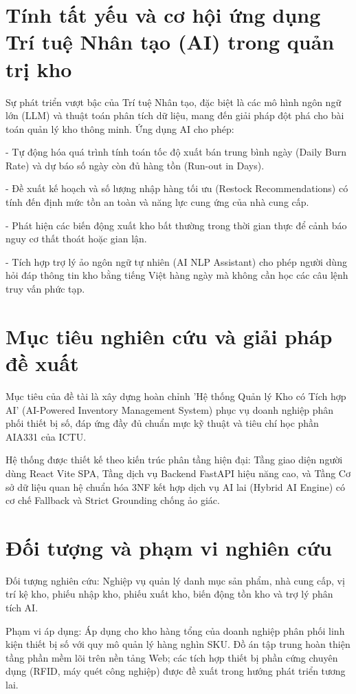 \section{Tính tất yếu và cơ hội ứng dụng Trí tuệ Nhân tạo (AI) trong quản trị kho}

Sự phát triển vượt bậc của Trí tuệ Nhân tạo, đặc biệt là các mô hình ngôn ngữ lớn (LLM) và thuật toán phân tích dữ liệu, mang đến giải pháp đột phá cho bài toán quản lý kho thông minh. Ứng dụng AI cho phép:

- Tự động hóa quá trình tính toán tốc độ xuất bán trung bình ngày (Daily Burn Rate) và dự báo số ngày còn đủ hàng tồn (Run-out in Days).

- Đề xuất kế hoạch và số lượng nhập hàng tối ưu (Restock Recommendations) có tính đến định mức tồn an toàn và năng lực cung ứng của nhà cung cấp.

- Phát hiện các biến động xuất kho bất thường trong thời gian thực để cảnh báo nguy cơ thất thoát hoặc gian lận.

- Tích hợp trợ lý ảo ngôn ngữ tự nhiên (AI NLP Assistant) cho phép người dùng hỏi đáp thông tin kho bằng tiếng Việt hàng ngày mà không cần học các câu lệnh truy vấn phức tạp.

\section{Mục tiêu nghiên cứu và giải pháp đề xuất}

Mục tiêu của đề tài là xây dựng hoàn chỉnh 'Hệ thống Quản lý Kho có Tích hợp AI' (AI-Powered Inventory Management System) phục vụ doanh nghiệp phân phối thiết bị số, đáp ứng đầy đủ chuẩn mực kỹ thuật và tiêu chí học phần AIA331 của ICTU.

Hệ thống được thiết kế theo kiến trúc phân tầng hiện đại: Tầng giao diện người dùng React Vite SPA, Tầng dịch vụ Backend FastAPI hiệu năng cao, và Tầng Cơ sở dữ liệu quan hệ chuẩn hóa 3NF kết hợp dịch vụ AI lai (Hybrid AI Engine) có cơ chế Fallback và Strict Grounding chống ảo giác.

\section{Đối tượng và phạm vi nghiên cứu}

Đối tượng nghiên cứu: Nghiệp vụ quản lý danh mục sản phẩm, nhà cung cấp, vị trí kệ kho, phiếu nhập kho, phiếu xuất kho, biến động tồn kho và trợ lý phân tích AI.

Phạm vi áp dụng: Áp dụng cho kho hàng tổng của doanh nghiệp phân phối linh kiện thiết bị số với quy mô quản lý hàng nghìn SKU. Đồ án tập trung hoàn thiện tầng phần mềm lõi trên nền tảng Web; các tích hợp thiết bị phần cứng chuyên dụng (RFID, máy quét công nghiệp) được đề xuất trong hướng phát triển tương lai.

